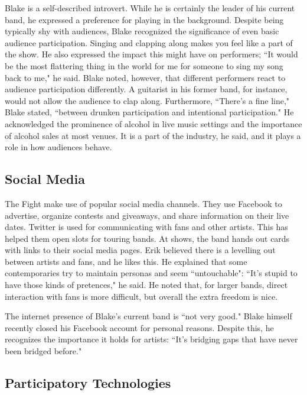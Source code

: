 Blake is a self-described introvert. While he is certainly the leader of his current band, he expressed a preference for playing in the background. Despite being typically shy with audiences, Blake recognized the significance of even basic audience participation. Singing and clapping along makes you feel like a part of the show. He also expressed the impact this might have on performers; ``It would be the most flattering thing in the world for me for someone to sing my song back to me," he said. Blake noted, however, that different performers react to audience participation differently. A guitarist in his former band, for instance, would not allow the audience to clap along. Furthermore, ``There's a fine line," Blake stated, ``between drunken participation and intentional participation." He acknowledged the prominence of alcohol in live music settings and the importance of alcohol sales at most venues. It is a part of the industry, he said, and it plays a role in how audiences behave.



\subsection{Social Media}

The Fight make use of popular social media channels. They use Facebook to advertise, organize contests and giveaways, and share information on their live dates. Twitter is used for communicating with fans and other artists. This has helped them open slots for touring bands. At shows, the band hands out cards with links to their social media pages. Erik believed there is a levelling out between artists and fans, and he likes this. He explained that some contemporaries try to maintain personas and seem ``untouchable": ``It's stupid to have those kinds of pretences," he said. He noted that, for larger bands, direct interaction with fans is more difficult, but overall the extra freedom is nice.

The internet presence of Blake's current band is ``not very good." Blake himself recently closed his Facebook account for personal reasons. Despite this, he recognizes the importance it holds for artists: ``It's bridging gaps that have never been bridged before." 



\subsection{Participatory Technologies}

